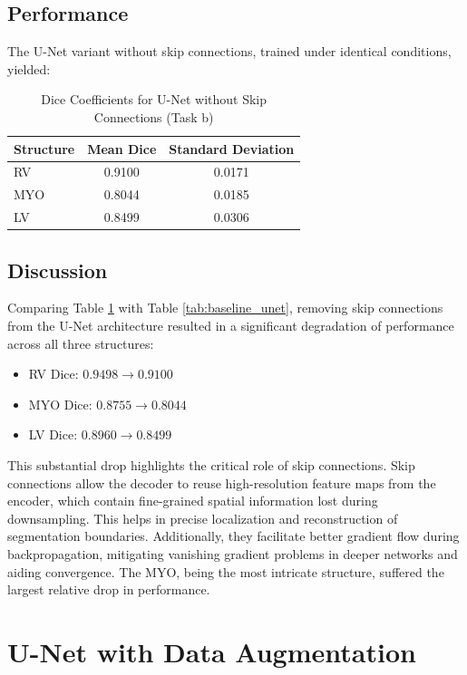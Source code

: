 \documentclass{article}
\begin{document}
\subsection{Performance}
The U-Net variant without skip connections, trained under identical conditions, yielded:
\begin{table}[H]
\centering
\caption{Dice Coefficients for U-Net without Skip Connections (Task b)}
\label{tab:no_shortcut_unet}
\begin{tabular}{lcc}
\toprule
Structure & Mean Dice & Standard Deviation \\
\midrule
RV        & 0.9100    & 0.0171             \\
MYO       & 0.8044    & 0.0185             \\
LV        & 0.8499    & 0.0306             \\
\bottomrule
\end{tabular}
\end{table}

\subsection{Discussion}
Comparing Table \ref{tab:no_shortcut_unet} with Table \ref{tab:baseline_unet}, removing skip connections from the U-Net architecture 
resulted in a significant degradation of performance across all three structures:
\begin{itemize}
  \item RV Dice: $0.9498 \rightarrow 0.9100$
  \item MYO Dice: $0.8755 \rightarrow 0.8044$
  \item LV Dice: $0.8960 \rightarrow 0.8499$
\end{itemize}
This substantial drop highlights the critical role of skip connections. Skip connections allow the decoder to reuse high-resolution 
feature maps from the encoder, which contain fine-grained spatial information lost during downsampling. This helps in precise 
localization and reconstruction of segmentation boundaries. Additionally, they facilitate better gradient flow during backpropagation, 
mitigating vanishing gradient problems in deeper networks and aiding convergence. The MYO, being the most intricate structure, 
suffered the largest relative drop in performance.



\section{U-Net with Data Augmentation}
\end{document}
